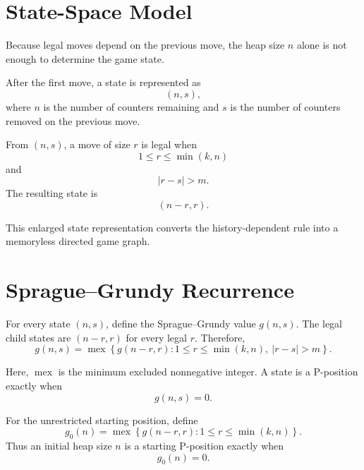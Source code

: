 \documentclass[11pt]{article}
\newcommand{\mex}{\operatorname{mex}}
\begin{document}
\section{State-Space Model}

Because legal moves depend on the previous move, the heap size $n$ alone is not enough to determine the game state.

After the first move, a state is represented as
\begin{equation}
    (n,s),
\end{equation}
where $n$ is the number of counters remaining and $s$ is the number of counters removed on the previous move.

From $(n,s)$, a move of size $r$ is legal when
\begin{equation}
    1\le r\le\min(k,n)
\end{equation}
and
\begin{equation}
    |r-s|>m.
\end{equation}
The resulting state is
\begin{equation}
    (n-r,r).
\end{equation}

This enlarged state representation converts the history-dependent rule into a memoryless directed game graph.

\section{Sprague--Grundy Recurrence}

For every state $(n,s)$, define the Sprague--Grundy value $g(n,s)$. The legal child states are $(n-r,r)$ for every legal $r$. Therefore,
\begin{equation}
\boxed{
    g(n,s)=
    \mex\left\{
        g(n-r,r):
        1\le r\le\min(k,n),\ |r-s|>m
    \right\}.
}
\end{equation}

Here, $\mex$ is the minimum excluded nonnegative integer. A state is a P-position exactly when
\begin{equation}
    g(n,s)=0.
\end{equation}

For the unrestricted starting position, define
\begin{equation}
\boxed{
    g_0(n)=
    \mex\left\{
        g(n-r,r):1\le r\le\min(k,n)
    \right\}.
}
\end{equation}
Thus an initial heap size $n$ is a starting P-position exactly when
\begin{equation}
    g_0(n)=0.
\end{equation}
\end{document}
